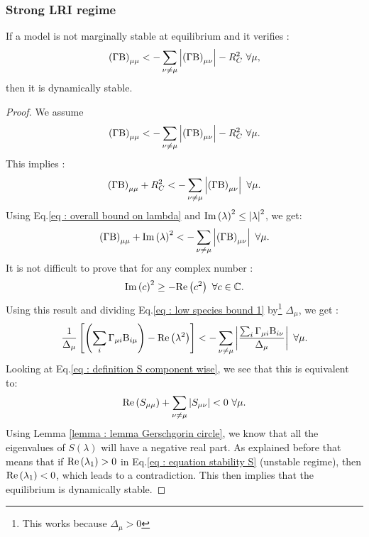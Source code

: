 \documentclass[12pt, titlepage]{report}
\begin{document}
\subsubsection{Strong LRI regime}
\begin{theorem}\label{theorem : strong LRI regime}
If a model is not marginally stable at equilibrium and it verifies :
\begin{equation}
\left(\Gamma \Beta\right)_{\mu\mu} < - \sum_{\nu \neq \mu } \abs{\left(\Gamma \Beta\right)_{\mu \nu}} - R_C^2 \ \forall \mu,
\end{equation}
then it is dynamically stable.
\end{theorem}
\begin{proof}
We assume
\begin{equation}
\left(\Gamma \text{B}\right)_{\mu\mu} < - \sum_{\nu \neq \mu } \left|{\left(\Gamma \text{B}\right)_{\mu \nu}}\right| -R_C^2 \ \forall \mu.
\end{equation}
This implies :
\begin{equation}
\left(\Gamma \text{B}\right)_{\mu\mu} + R_C^2< - \sum_{\nu \neq \mu } \left|{\left(\Gamma \text{B}\right)_{\mu \nu}}\right| \ \forall \mu.
\end{equation}
Using Eq.\eqref{eq : overall bound on lambda} and $\text{Im}\left(\lambda\right)^2 \leq \left|{\lambda}\right|^2$, we get:
\begin{equation}
  \left(\Gamma\text{B} \right)_{\mu\mu} + \text{Im}\left(\lambda\right)^2 < - \sum_{\nu \neq \mu } \left|{\left(\Gamma \text{B}\right)_{\mu \nu}}\right| \ \forall \mu. \label{eq : low species bound 1}
\end{equation}
It is not difficult to prove that for any complex number :
\begin{equation}
\text{Im}\left(c\right)^2 \geq - \text{Re}\left(c^2\right) \ \forall c \in \mathbb{C}.
\end{equation}
Using this result and dividing Eq.\eqref{eq : low species bound 1} by\footnote{This works because $\Delta_\mu > 0$} $\Delta_\mu$, we get :
\begin{equation}
\frac{1}{\Delta_\mu}\left[\left(\sum_i \Gamma_{\mu i} \text{B}_{i \mu} \right)-\text{Re}\left(\lambda^2\right)\right] < - \sum_{\nu \neq \mu } \left|{\frac{\sum_i \Gamma_{\mu i}\text{B}_{i\nu}}{\Delta_\mu}}\right| \ \forall \mu.
\end{equation}
Looking at Eq.\eqref{eq : definition S component wise}, we see that this is equivalent to:
\begin{equation}
\text{Re}\left(S_{\mu \mu}\right) + \sum_{\nu \neq \mu} \left|{S_{\mu \nu}}\right| < 0\ \forall \mu.
\end{equation}
Using Lemma \ref{lemma : lemma Gerschgorin circle}, we know that all the eigenvalues of $S(\lambda)$ will have a negative real part.
As explained before that means that if $\text{Re}\left(\lambda_1\right) > 0 $ in Eq.\eqref{eq : equation stability S} (unstable regime), then $\text{Re}\left(\lambda_1\right) < 0$, which leads to a contradiction. This then implies that the equilibrium is dynamically stable.
\end{proof}
\end{document}
